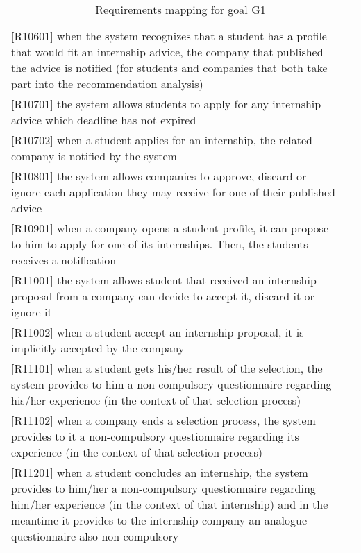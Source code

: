 \begin{table} [h!]
\begin{tabular}{ || P{7.5cm} P{7.5cm} || }
					[R10601] when the system recognizes that a student has a profile that would fit an internship advice, the company that published the advice is notified (for students and companies that both take part into the recommendation analysis) & \\
					
					[R10701] the system allows students to apply for any internship advice which deadline has not expired & \\
					
					[R10702] when a student applies for an internship, the related company is notified by the system & \\
					
					[R10801] the system allows companies to approve, discard or ignore each application they may receive for one of their published advice & \\
					
					[R10901] when a company opens a student profile, it can propose to him to apply for one of its internships. Then, the students receives a notification & \\
					
					[R11001] the system allows student that received an internship proposal from a company can decide to accept it, discard it or ignore it & \\
					
					[R11002] when a student accept an internship proposal, it is implicitly accepted by the company & \\
					
					[R11101] when a student gets his/her result of the selection, the system provides to him a non-compulsory questionnaire regarding his/her experience (in the context of that selection process)& \\
					
					[R11102] when a company ends a selection process, the system provides to it a non-compulsory questionnaire regarding its experience (in the context of that selection process) & \\
					
					[R11201] when a student concludes an internship, the system provides to him/her a non-compulsory questionnaire regarding him/her experience (in the context of that internship) and in the meantime it provides to the internship company an analogue questionnaire also non-compulsory & \\
					
					\hline
				\end{tabular}
				\caption{Requirements mapping for goal G1}
				\label {table:1}
			\end{table}
